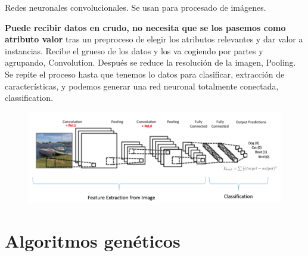 \documentclass[12pt]{report} %
\begin{document}
Redes neuronales convolucionales. Se usan para procesado de imágenes.

\textbf{Puede recibir datos en crudo, no necesita que se los pasemos
como atributo valor} tras un preproceso de elegir los atributos
relevantes y dar valor a instancias. Recibe el grueso de los datos y los
va cogiendo por partes y agrupando, Convolution. Después se reduce la
resolución de la imagen, Pooling. Se repite el proceso hasta que tenemos
lo datos para clasificar, extracción de características, y podemos
generar una red neuronal totalmente conectada, classification.

\begin{figure}[H]
	{\includegraphics[scale=.3]{image-20210312111406573.png}}
\end{figure}

\section{Algoritmos genéticos}
\end{document}
